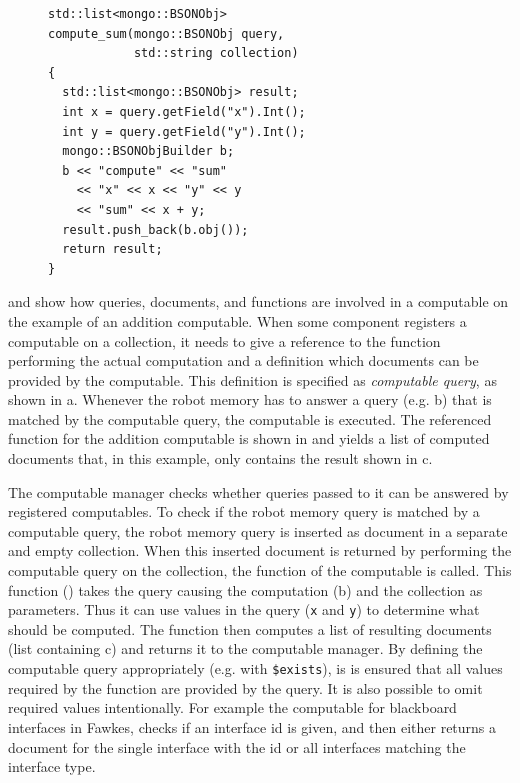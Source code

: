 \begin{figure}
  \vspace{-0.8cm}
\begin{lstlisting}[style=SmallCpp,
  caption={Function of a computable},
  label=lst:comp-func,
  framexleftmargin=5pt, xleftmargin=0pt,
 morekeywords={}, numbers=none]
std::list<mongo::BSONObj>
compute_sum(mongo::BSONObj query,
            std::string collection)
{
  std::list<mongo::BSONObj> result;
  int x = query.getField("x").Int();
  int y = query.getField("y").Int();
  mongo::BSONObjBuilder b;
  b << "compute" << "sum"
    << "x" << x << "y" << y
    << "sum" << x + y;
  result.push_back(b.obj());
  return result;
}
\end{lstlisting}
\vspace{-8mm}
\end{figure}

 and  show how queries,
documents, and functions are involved in a computable on the example
of an addition computable. When some component registers a computable
on a collection, it needs to give a reference to the function
performing the actual computation and a definition which documents can
be provided by the computable. This definition is specified as
\emph{computable query}, as shown in a. Whenever the
robot memory has to answer a query (e.g. b) that is
matched by the computable query, the computable is executed. The
referenced function for the addition computable is shown in
 and yields a list of computed documents that,
in this example, only contains the result shown in c.

The computable manager checks whether queries passed to it can be
answered by registered computables. To check if the robot memory query
is matched by a computable query, the robot memory query is inserted
as document in a separate and empty collection. When this inserted
document is returned by performing the computable query on the
collection, the function of the computable is called. This function
() takes the query causing the computation
(b) and the collection as parameters. Thus it can use
values in the query (\texttt{x} and \texttt{y}) to determine what
should be computed. The function then computes a list of resulting
documents (list containing c) and returns it to the
computable manager. By defining the computable query appropriately
(e.g. with \texttt{\$exists}), is is ensured that all values required
by the function are provided by the query. It is also possible to
omit required values intentionally. For example the computable for
blackboard interfaces in Fawkes, checks if an interface id is given,
and then either returns a document for the single interface with the
id or all interfaces matching the interface type.

